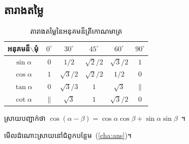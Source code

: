 \documentclass[12pt]{book}
\begin{document}
	\subsection{តារាងតម្លៃ}
	\begin{table}[H]
		\centering
		\begin{tabular}{|c|c|c|c|c|c|}
			\hline
			អនុគមន៏$ \backslash $មុំ & $ 0^\circ $ & $ 30^\circ $ & $ 45^\circ $ & $ 60^\circ $ & $ 90^\circ $\\
			\hline
			$ \sin\alpha $ & $ 0 $ & $ 1/2 $ & $ \sqrt{2}/2 $ & $ \sqrt{3}/2 $ & $ 1 $\\
			\hline
			$ \cos\alpha $ & $ 1 $ & $ \sqrt{3}/2 $ & $ \sqrt{2}/2 $ & $ 1/2 $ & $ 0 $\\
			\hline
			$ \tan\alpha $ & $ 0 $ & $ \sqrt{3}/3 $ & $ 1 $ & $ \sqrt{3} $ & $ \parallel $\\
			\hline
			$ \cot\alpha $ & $ \parallel $ & $ \sqrt{3} $ & $ 1 $ & $ \sqrt{3}/2 $ & $ 0 $\\
			\hline
		\end{tabular}
		\caption{តារាងតម្លៃនៃអនុគមន៏ត្រីកោណមាត្រ}
	\end{table}
	\begin{exercise}\label{exe:cos}
		ស្រាយបញ្ជាក់ថា $ \cos(\alpha-\beta)=\cos\alpha\cos\beta+\sin\alpha\sin\beta $~។
	\end{exercise}
	\begin{remark}
		មើលដំណោះស្រាយនៅជំពូកបន្ថែម~(\ref{cha:ans})។
	\end{remark}
	\appendix
\end{document}
